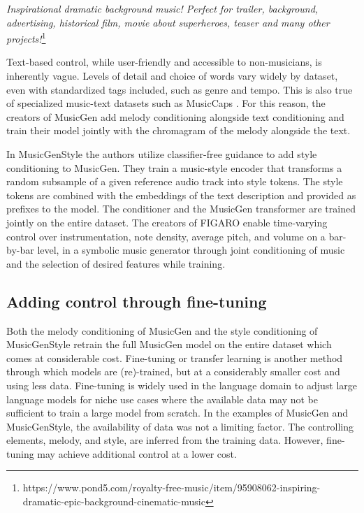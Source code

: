 \textit{Inspirational dramatic background music! Perfect for trailer, background, advertising, historical film, movie about superheroes, teaser and many other projects!}\footnote{ https://www.pond5.com/royalty-free-music/item/95908062-inspiring-dramatic-epic-background-cinematic-music
}

Text-based control, while user-friendly and accessible to non-musicians, is inherently vague. Levels of detail and choice of words vary widely by dataset, even with standardized tags included, such as genre and tempo. This is also true of specialized music-text datasets such as MusicCaps \cite{Agostinelli_Denk_Borsos_Engel_Verzetti_Caillon_Huang_Jansen_Roberts_Tagliasacchi_et_al._2023}\cite{Lee_Doh_Jeong_2023_subjectivity_musiccaps}. For this reason, the creators of MusicGen \cite{copet2023simple} add melody conditioning alongside text conditioning and train their model jointly with the chromagram of the melody alongside the text. 

In MusicGenStyle \cite{Rouard_Adi_Copet_Roebel_Défossez_musicgenstyle_2024} the authors utilize classifier-free guidance to add style conditioning to MusicGen. They train a music-style encoder that transforms a random subsample of a given reference audio track into style tokens. The style tokens are combined with the embeddings of the text description and provided as prefixes to the model. The conditioner and the MusicGen transformer are trained jointly on the entire dataset. 
The creators of FIGARO \cite{Rütte_figaro_2023} enable time-varying control over instrumentation, note density, average pitch, and volume on a bar-by-bar level, in a symbolic music generator through joint conditioning of music and the selection of desired features while training. 
\subsection{Adding control through fine-tuning}

Both the melody conditioning of MusicGen \cite{copet2023simple} and the style conditioning of MusicGenStyle \cite{Rouard_Adi_Copet_Roebel_Défossez_musicgenstyle_2024} retrain the full MusicGen model on the entire dataset which comes at considerable cost. Fine-tuning or transfer learning is another method through which models are (re)-trained, but at a considerably smaller cost and using less data. Fine-tuning is widely used in the language domain to adjust large language models for niche use cases where the available data may not be sufficient to train a large model from scratch. In the examples of MusicGen and MusicGenStyle, the availability of data was not a limiting factor. The controlling elements, melody, and style, are inferred from the training data. However, fine-tuning may achieve additional control at a lower cost. 

